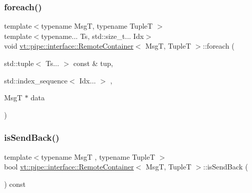 \mbox{\label{structvt_1_1pipe_1_1interface_1_1_remote_container_ab582dacea24fd4f46e991f79368803b9}} 
\subsubsection{\texorpdfstring{foreach()}{foreach()}\hspace{0.1cm}{\footnotesize\ttfamily [2/2]}}
{\footnotesize\ttfamily template$<$typename MsgT, typename TupleT $>$ \\
template$<$typename... Ts, std\+::size\+\_\+t... Idx$>$ \\
void \hyperlink{structvt_1_1pipe_1_1interface_1_1_remote_container}{vt\+::pipe\+::interface\+::\+Remote\+Container}$<$ MsgT, TupleT $>$\+::foreach (\begin{DoxyParamCaption}\item[{std\+::tuple$<$ Ts... $>$ const \&}]{tup,  }\item[{std\+::index\+\_\+sequence$<$ Idx... $>$}]{,  }\item[{MsgT $\ast$}]{data }\end{DoxyParamCaption})\hspace{0.3cm}{\ttfamily [private]}}

\mbox{\label{structvt_1_1pipe_1_1interface_1_1_remote_container_a6e50085da5d33822dde0c556ff027614}} 
\subsubsection{\texorpdfstring{is\+Send\+Back()}{isSendBack()}}
{\footnotesize\ttfamily template$<$typename MsgT , typename TupleT $>$ \\
bool \hyperlink{structvt_1_1pipe_1_1interface_1_1_remote_container}{vt\+::pipe\+::interface\+::\+Remote\+Container}$<$ MsgT, TupleT $>$\+::is\+Send\+Back (\begin{DoxyParamCaption}{ }\end{DoxyParamCaption}) const\hspace{0.3cm}{\ttfamily [private]}}

